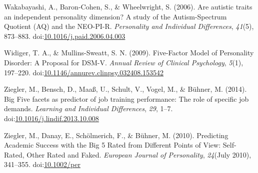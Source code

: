 \documentclass[,man]{apa6}
\theoremstyle{definition}
\theoremstyle{definition}
\theoremstyle{definition}
\theoremstyle{remark}
\begin{document}
\leavevmode\hypertarget{ref-Wakabayashi2006}{}%
Wakabayashi, A., Baron-Cohen, S., \& Wheelwright, S. (2006). Are
autistic traits an independent personality dimension? A study of the
Autism-Spectrum Quotient (AQ) and the NEO-PI-R. \emph{Personality and
Individual Differences}, \emph{41}(5), 873--883.
doi:\href{https://doi.org/10.1016/j.paid.2006.04.003}{10.1016/j.paid.2006.04.003}

\leavevmode\hypertarget{ref-WidigerMullins2009}{}%
Widiger, T. A., \& Mullins-Sweatt, S. N. (2009). Five-Factor Model of
Personality Disorder: A Proposal for DSM-V. \emph{Annual Review of
Clinical Psychology}, \emph{5}(1), 197--220.
doi:\href{https://doi.org/10.1146/annurev.clinpsy.032408.153542}{10.1146/annurev.clinpsy.032408.153542}

\leavevmode\hypertarget{ref-Ziegler2014}{}%
Ziegler, M., Bensch, D., Maaß, U., Schult, V., Vogel, M., \& Bühner, M.
(2014). Big Five facets as predictor of job training performance: The
role of specific job demands. \emph{Learning and Individual
Differences}, \emph{29}, 1--7.
doi:\href{https://doi.org/10.1016/j.lindif.2013.10.008}{10.1016/j.lindif.2013.10.008}

\leavevmode\hypertarget{ref-Ziegler2010}{}%
Ziegler, M., Danay, E., Schölmerich, F., \& Bühner, M. (2010).
Predicting Academic Success with the Big 5 Rated from Different Points
of View: Self-Rated, Other Rated and Faked. \emph{European Journal of
Personality}, \emph{24}(July 2010), 341--355.
doi:\href{https://doi.org/10.1002/per}{10.1002/per}

\endgroup

\clearpage

\renewcommand{\listtablename}{Table captions}

\listoftables
\end{document}
